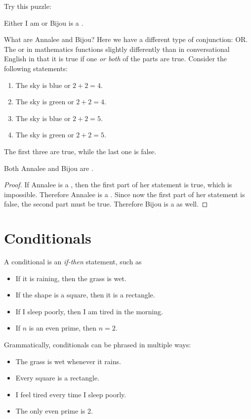 \documentclass{tufte-book}
\begin{document}
Try this puzzle:
\begin{example}
  \begin{dialogue}
     Either I am \knave or Bijou is a \knight.
  \end{dialogue}
\end{example}
What are Annalee and Bijou? Here we have a different type of conjunction: OR. The or in mathematics functions slightly differently than in conversational English in that it is true if one \emph{or both} of the parts are true. Consider the following statements:
\begin{enumerate}
    \item The sky is blue or $2 + 2 = 4$.
    \item The sky is green or $2 + 2 = 4$.
    \item The sky is blue or $2 + 2 = 5$.
    \item The sky is green or $2 + 2 = 5$.
\end{enumerate}
The first three are true, while the last one is false. 

\begin{claim}
  Both Annalee and Bijou are \knights.
\end{claim}

\begin{proof}
  If Annalee is a \knave, then the first part of her statement is true, which is impossible. Therefore Annalee is a \knight. Since now the first part of her statement is false, the second part must be true. Therefore Bijou is a \knight as well.
\end{proof}



\section{Conditionals}
\label{sec:conditionals}

A conditional is an \emph{if-then} statement, such as
\begin{itemize}
    \item If it is raining, then the grass is wet.
    \item If the shape is a square, then it is a rectangle.
    \item If I sleep poorly, then I am tired in the morning.
    \item If $n$ is an even prime, then $n = 2$.
\end{itemize}
Grammatically, conditionals can be phrased in multiple ways:
\begin{itemize}
    \item The grass is wet whenever it rains.
    \item Every square is a rectangle.
    \item I feel tired every time I sleep poorly.
    \item The only even prime is 2.
\end{itemize}
\end{document}
